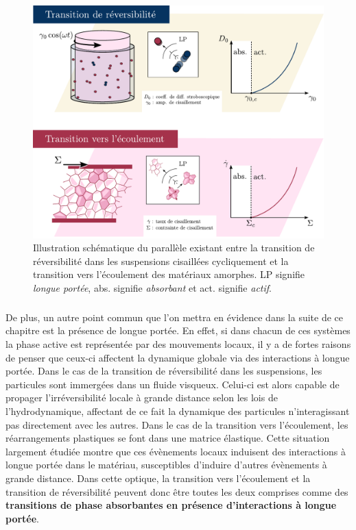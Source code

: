 \begin{figure}[H]
	\centering
	\includegraphics[width=\textwidth]{Chapitre1/Figures/Chapo/Resume.pdf}
	\caption{Illustration schématique du parallèle existant entre la transition de réversibilité dans les suspensions cisaillées cycliquement et la transition vers l'écoulement des matériaux amorphes. LP signifie \textit{longue portée}, abs. signifie \textit{absorbant} et act. signifie \textit{actif}.}
	\label{fig:banger}
\end{figure}

\subparagraph{}De plus, un autre point commun que l'on mettra en évidence dans la suite de ce chapitre est la présence de longue portée. En effet, si dans chacun de ces systèmes la phase active est représentée par des mouvements locaux, il y a de fortes raisons de penser que ceux-ci affectent la dynamique globale via des interactions à longue portée. Dans le cas de la transition de réversibilité dans les suspensions, les particules sont immergées dans un fluide visqueux. Celui-ci est alors capable de propager l'irréversibilité locale à grande distance selon les lois de l'hydrodynamique, affectant de ce fait la dynamique des particules n'interagissant pas directement avec les autres. Dans le cas de la transition vers l'écoulement, les réarrangements plastiques se font dans une matrice élastique. Cette situation largement étudiée montre que ces évènements locaux induisent des interactions à longue portée dans le matériau, susceptibles d'induire d'autres évènements à grande distance. Dans cette optique, la transition vers l'écoulement et la transition de réversibilité peuvent donc être toutes les deux comprises comme des \textbf{transitions de phase absorbantes en présence d'interactions à longue portée}.

